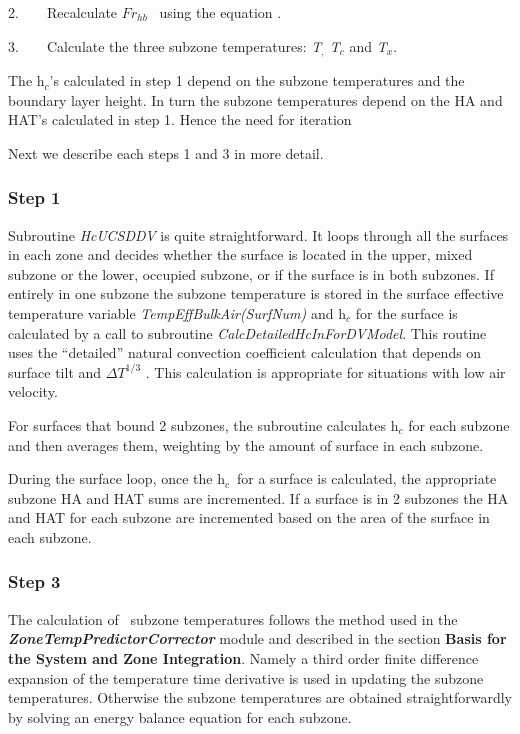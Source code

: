2.~~~~Recalculate \(F{r_{hb}}\) ~using the equation .

3.~~~~Calculate the three subzone temperatures: \emph{T\(_{,}\) T\(_{c}\)} and \emph{T\(_{x}\)}.

The h\(_{c}\)'s calculated in step 1 depend on the subzone temperatures and the boundary layer height. In turn the subzone temperatures depend on the HA and HAT's calculated in step 1. Hence the need for iteration

Next we describe each steps 1 and 3 in more detail.

\subsubsection{Step 1}\label{step-1}

Subroutine \emph{HcUCSDDV} is quite straightforward. It loops through all the surfaces in each zone and decides whether the surface is located in the upper, mixed subzone or the lower, occupied subzone, or if the surface is in both subzones. If entirely in one subzone the subzone temperature is stored in the surface effective temperature variable \emph{TempEffBulkAir(SurfNum)} and h\(_{c}\) for the surface is calculated by a call to subroutine \emph{CalcDetailedHcInForDVModel}. This routine uses the ``detailed'' natural convection coefficient calculation that depends on surface tilt and \(\Delta {T^{1/3}}\) . This calculation is appropriate for situations with low air velocity.

For surfaces that bound 2 subzones, the subroutine calculates h\(_{c}\) for each subzone and then averages them, weighting by the amount of surface in each subzone.

During the surface loop, once the h\(_{c}\)~for a surface is calculated, the appropriate subzone HA and HAT sums are incremented. If a surface is in 2 subzones the HA and HAT for each subzone are incremented based on the area of the surface in each subzone.

\subsubsection{Step 3}\label{step-3}

The calculation of~ subzone temperatures follows the method used in the \textbf{\emph{ZoneTempPredictorCorrector}} module and described in the section \textbf{Basis for the System and Zone Integration}. Namely a third order finite difference expansion of the temperature time derivative is used in updating the subzone temperatures. Otherwise the subzone temperatures are obtained straightforwardly by solving an energy balance equation for each subzone.

